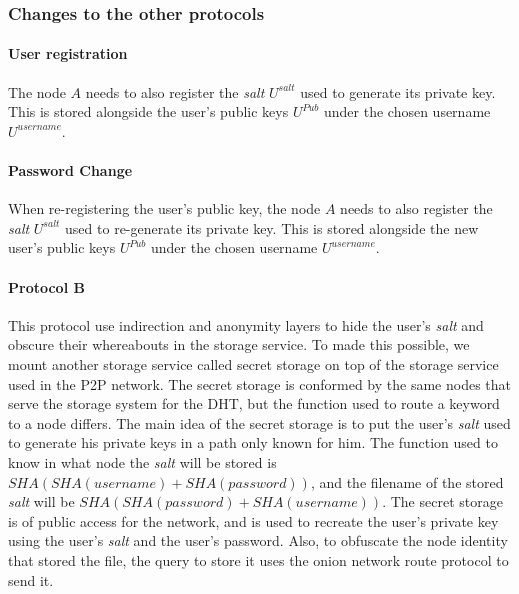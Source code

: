 \subsubsection{Changes to the other protocols}
\paragraph{User registration}
The node $A$ needs to also register the \textit{salt} $U^{salt}$ used to
generate its private key. This is stored alongside the user's public keys $U^{Pub}$ under the
chosen username $U^{username}$.


\paragraph{Password Change}
When re-registering the user's public key, the node $A$ needs to also register the \textit{salt} $U^{salt}$ used to
re-generate its private key. This is stored alongside the new user's public keys $U^{Pub}$ under the
chosen username $U^{username}$.


\paragraph{Protocol B}

This protocol use indirection and anonymity layers to hide the user's
\textit{salt} and obscure their whereabouts in the storage service.
To made this possible, we mount another storage service called secret storage
on top of the storage service used in the P2P network. The secret storage is conformed
by the same nodes that serve the storage system for the DHT, but the function
used to route a keyword to a node differs. The main idea of the secret storage
is to put the user's \textit{salt} used to generate his private keys in a
path only known for him. The function used to know in what node the
\textit{salt} will be stored is $SHA(SHA(username)+SHA(password))$, and the
filename of the stored \textit{salt} will be
$SHA(SHA(password)+SHA(username))$. The secret storage is of public access for
the network, and is used to recreate the user's private key using the user's
\textit{salt} and the user's password. Also, to obfuscate the node identity that
stored the file, the query to store it uses the onion network route protocol to
send it.

